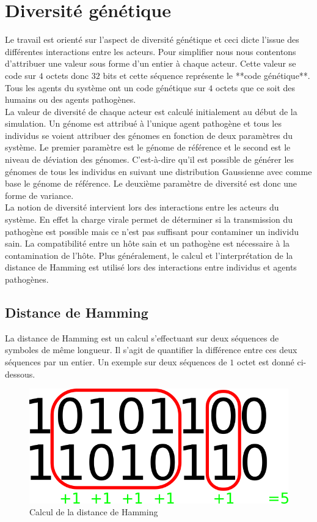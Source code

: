 \section{Diversité génétique}

Le travail est orienté sur l'aspect de diversité génétique et ceci dicte l'issue des différentes interactions entre les acteurs. Pour simplifier nous nous contentons d'attribuer une valeur sous forme d'un entier à chaque acteur. Cette valeur se code sur $4$ octets donc $32$ bits et cette séquence représente le **code génétique**. Tous les agents du système ont un code génétique sur $4$ octets que ce soit des humains ou des agents pathogènes.\\

La valeur de diversité de chaque acteur est calculé initialement au début de la simulation. Un génome est attribué à l'unique agent pathogène et tous les individus se voient attribuer des génomes en fonction de deux paramètres du système. Le premier paramètre est le génome de référence et le second est le niveau de déviation des génomes. C'est-à-dire qu'il est possible de générer les génomes de tous les individus en suivant une distribution Gaussienne avec comme base le génome de référence. Le deuxième paramètre de diversité est donc une forme de variance.\\

La notion de diversité intervient lors des interactions entre les acteurs du système. En effet la charge virale permet de déterminer si la transmission du pathogène est possible mais ce n'est pas suffisant pour contaminer un individu sain. La compatibilité entre un hôte sain et un pathogène est nécessaire à la contamination de l'hôte. Plus généralement, le calcul et l'interprétation de la distance de Hamming est utilisé lors des interactions entre individus et agents pathogènes. 

\subsection{Distance de Hamming}

La distance de Hamming est un calcul s'effectuant sur deux séquences de symboles de même longueur. Il s'agit de quantifier la différence entre ces deux séquences par un entier. Un exemple sur deux séquences de $1$ octet est donné ci-dessous.\\

\begin{figure}[h]
\centering
\captionsetup{justification=centering}
\includegraphics[scale=1]{Images/hamming.png}
\caption{Calcul de la distance de Hamming}
\end{figure}

